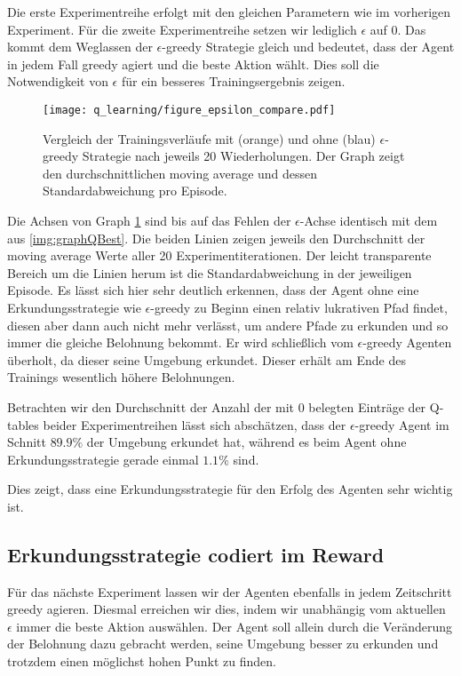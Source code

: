 Die erste Experimentreihe erfolgt mit den gleichen Parametern wie im vorherigen Experiment. Für die zweite Experimentreihe setzen wir lediglich $ \epsilon $ auf 0. Das kommt dem Weglassen der $ \epsilon $-greedy Strategie gleich und bedeutet, dass der Agent in jedem Fall greedy agiert und die beste Aktion wählt. Dies soll die Notwendigkeit von $ \epsilon $ für ein besseres Trainingsergebnis zeigen.
\begin{figure}[H]
    \centering
    \texttt{[image: q\_learning/figure\_epsilon\_compare.pdf]}
    \caption{Vergleich der Trainingsverläufe mit (orange) und ohne (blau) $ \epsilon $-greedy Strategie nach jeweils 20 Wiederholungen. Der Graph zeigt den durchschnittlichen moving average und dessen Standardabweichung pro Episode.} \label{img:graphQEpsComp}
\end{figure}
Die Achsen von Graph \ref{img:graphQEpsComp} sind bis auf das Fehlen der $ \epsilon $-Achse identisch mit dem aus \ref{img:graphQBest}. Die beiden Linien zeigen jeweils den Durchschnitt der moving average Werte aller 20 Experimentiterationen. Der leicht transparente Bereich um die Linien herum ist die Standardabweichung in der jeweiligen Episode.
Es lässt sich hier sehr deutlich erkennen, dass der Agent ohne eine Erkundungsstrategie wie $ \epsilon $-greedy zu Beginn einen relativ lukrativen Pfad findet, diesen aber dann auch nicht mehr verlässt, um andere Pfade zu erkunden und so immer die gleiche Belohnung bekommt. Er wird schließlich vom $ \epsilon $-greedy Agenten überholt, da dieser seine Umgebung erkundet. Dieser erhält am Ende des Trainings wesentlich höhere Belohnungen.

Betrachten wir den Durchschnitt der Anzahl der mit 0 belegten Einträge der Q-tables beider Experimentreihen lässt sich abschätzen, dass der $ \epsilon $-greedy Agent im Schnitt $ 89.9\% $ der Umgebung erkundet hat, während es beim Agent ohne Erkundungsstrategie gerade einmal $ 1.1\% $ sind.

Dies zeigt, dass eine Erkundungsstrategie für den Erfolg des Agenten sehr wichtig ist.

\subsection{Erkundungsstrategie codiert im Reward}
Für das nächste Experiment lassen wir der Agenten ebenfalls in jedem Zeitschritt greedy agieren. Diesmal erreichen wir dies, indem wir unabhängig vom aktuellen $ \epsilon $ immer die beste Aktion auswählen. Der Agent soll allein durch die Veränderung der Belohnung dazu gebracht werden, seine Umgebung besser zu erkunden und trotzdem einen möglichst hohen Punkt zu finden.

